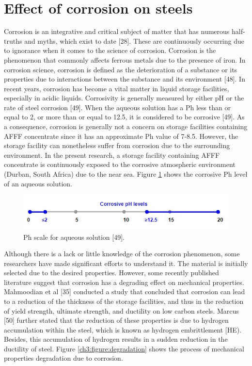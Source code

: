 \documentclass[12pt]{report}
\begin{document}
\section{Effect of corrosion on steels}
Corrosion is an integrative and critical subject of matter that has numerous half-truths and myths, which exist to date [28]. These are continuously occurring due to ignorance when it comes to the science of corrosion.  Corrosion is the phenomenon that commonly affects ferrous metals due to the presence of iron. In corrosion science, corrosion is defined as the deterioration of a substance or its properties due to interactions between the substance and its environment [48].
In recent years, corrosion has become a vital matter in liquid storage facilities, especially in acidic liquids. Corrosivity is generally measured by either pH or the rate of steel corrosion [49]. When the aqueous solution has a Ph less than or equal to 2, or more than or equal to 12.5, it is considered to be corrosive [49]. As a consequence, corrosion is generally not a concern on storage facilities containing AFFF concentrate since it has an approximate Ph value of 7-8.5. However, the storage facility can nonetheless suffer from corrosion due to the surrounding environment. In the present research, a storage facility containing AFFF concentrate is continuously exposed to the corrosive atmospheric environment (Durban, South Africa) due to the near sea. Figure \ref{ch3:figure:ph} shows the corrosive Ph level of an aqueous solution. 
 
\begin{figure}[H]
    \centering
    \includegraphics[width=.8\textwidth]{aqueous_solution_ph_scale.jpg}
    \caption{Ph scale for aqueous solution [49].}
    \label{ch3:figure:ph}
\end{figure}

Although there is a lack or little knowledge of the corrosion phenomenon, some researchers have made significant efforts to understand it. The material is initially selected due to the desired properties. However, some recently published literature suggest that corrosion has a degrading effect on mechanical properties. Mahmoodian et al [35] conducted a study that concluded that corrosion can lead to a reduction of the thickness of the storage facilities, and thus in the reduction of yield strength, ultimate strength, and ductility on low carbon steels.  Marcus [50] further stated that the reduction of these properties is due to hydrogen accumulation within the steel, which is known as hydrogen embrittlement [HE). Besides, this accumulation of hydrogen results in a sudden reduction in the ductility of steel. Figure \ref{ch3:figure:degradation} shows the process of mechanical properties degradation due to corrosion.
 
\end{document}

